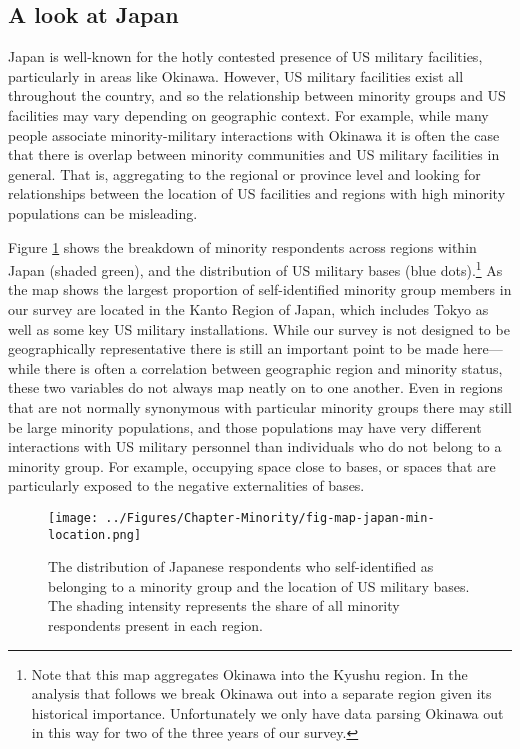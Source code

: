 \subsection*{A look at Japan}

Japan is well-known for the hotly contested presence of US military facilities, particularly in areas like Okinawa. However, US military facilities exist all throughout the country, and so the relationship between minority groups and US facilities may vary depending on geographic context. For example, while many people associate minority-military interactions with Okinawa it is often the case that there is overlap between minority communities and US military facilities in general. That is, aggregating to the regional or province level and looking for relationships between the location of US facilities and regions with high minority populations can be misleading. 

Figure \ref{fig:japanminoritymap} shows the breakdown of minority respondents across regions within Japan (shaded green), and the distribution of US military bases (blue dots).\footnote{Note that this map aggregates Okinawa into the Kyushu region. In the analysis that follows we break Okinawa out into a separate region given its historical importance. Unfortunately we only have data parsing Okinawa out in this way for two of the three years of our survey.} As the map shows the largest proportion of self-identified minority group members in our survey are located in the Kanto Region of Japan, which includes Tokyo as well as some key US military installations. While our survey is not designed to be geographically representative there is still an important point to be made here---while there is often a correlation between geographic region and minority status, these two variables do not always map neatly on to one another. Even in regions that are not normally synonymous with particular minority groups there may still be large minority populations, and those populations may have very different interactions with US military personnel than individuals who do not belong to a minority group. For example, occupying space close to bases, or spaces that are particularly exposed to the negative externalities of bases.


\begin{figure}[t]
	\centering\texttt{[image: ../Figures/Chapter-Minority/fig-map-japan-min-location.png]}
	\caption{The distribution of Japanese respondents who self-identified as belonging to a minority group and the location of US military bases. The shading intensity represents the share of all minority respondents present in each region.}
	\label{fig:japanminoritymap}
\end{figure}


